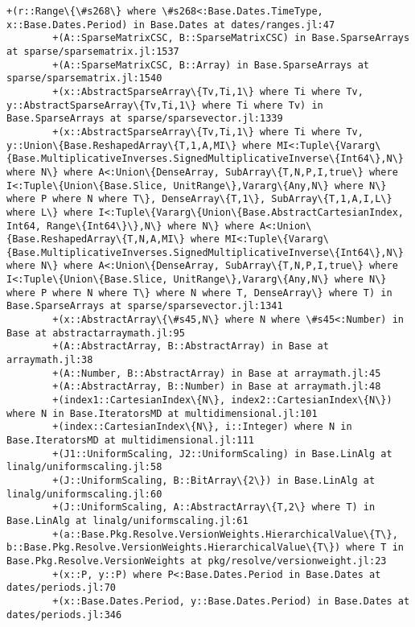 \documentclass[11pt]{article}
\begin{document}
\begin{Verbatim}[commandchars=\\\{\}]
        +(r::Range\{\#s268\} where \#s268<:Base.Dates.TimeType, x::Base.Dates.Period) in Base.Dates at dates/ranges.jl:47
        +(A::SparseMatrixCSC, B::SparseMatrixCSC) in Base.SparseArrays at sparse/sparsematrix.jl:1537
        +(A::SparseMatrixCSC, B::Array) in Base.SparseArrays at sparse/sparsematrix.jl:1540
        +(x::AbstractSparseArray\{Tv,Ti,1\} where Ti where Tv, y::AbstractSparseArray\{Tv,Ti,1\} where Ti where Tv) in Base.SparseArrays at sparse/sparsevector.jl:1339
        +(x::AbstractSparseArray\{Tv,Ti,1\} where Ti where Tv, y::Union\{Base.ReshapedArray\{T,1,A,MI\} where MI<:Tuple\{Vararg\{Base.MultiplicativeInverses.SignedMultiplicativeInverse\{Int64\},N\} where N\} where A<:Union\{DenseArray, SubArray\{T,N,P,I,true\} where I<:Tuple\{Union\{Base.Slice, UnitRange\},Vararg\{Any,N\} where N\} where P where N where T\}, DenseArray\{T,1\}, SubArray\{T,1,A,I,L\} where L\} where I<:Tuple\{Vararg\{Union\{Base.AbstractCartesianIndex, Int64, Range\{Int64\}\},N\} where N\} where A<:Union\{Base.ReshapedArray\{T,N,A,MI\} where MI<:Tuple\{Vararg\{Base.MultiplicativeInverses.SignedMultiplicativeInverse\{Int64\},N\} where N\} where A<:Union\{DenseArray, SubArray\{T,N,P,I,true\} where I<:Tuple\{Union\{Base.Slice, UnitRange\},Vararg\{Any,N\} where N\} where P where N where T\} where N where T, DenseArray\} where T) in Base.SparseArrays at sparse/sparsevector.jl:1341
        +(x::AbstractArray\{\#s45,N\} where N where \#s45<:Number) in Base at abstractarraymath.jl:95
        +(A::AbstractArray, B::AbstractArray) in Base at arraymath.jl:38
        +(A::Number, B::AbstractArray) in Base at arraymath.jl:45
        +(A::AbstractArray, B::Number) in Base at arraymath.jl:48
        +(index1::CartesianIndex\{N\}, index2::CartesianIndex\{N\}) where N in Base.IteratorsMD at multidimensional.jl:101
        +(index::CartesianIndex\{N\}, i::Integer) where N in Base.IteratorsMD at multidimensional.jl:111
        +(J1::UniformScaling, J2::UniformScaling) in Base.LinAlg at linalg/uniformscaling.jl:58
        +(J::UniformScaling, B::BitArray\{2\}) in Base.LinAlg at linalg/uniformscaling.jl:60
        +(J::UniformScaling, A::AbstractArray\{T,2\} where T) in Base.LinAlg at linalg/uniformscaling.jl:61
        +(a::Base.Pkg.Resolve.VersionWeights.HierarchicalValue\{T\}, b::Base.Pkg.Resolve.VersionWeights.HierarchicalValue\{T\}) where T in Base.Pkg.Resolve.VersionWeights at pkg/resolve/versionweight.jl:23
        +(x::P, y::P) where P<:Base.Dates.Period in Base.Dates at dates/periods.jl:70
        +(x::Base.Dates.Period, y::Base.Dates.Period) in Base.Dates at dates/periods.jl:346

\end{Verbatim}
\end{document}

